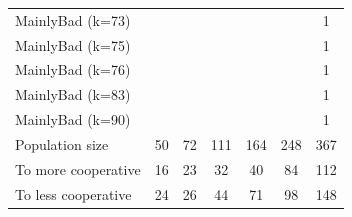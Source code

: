 \documentclass[journal,10pt,twoside]{IEEEtran}
\begin{document}
\begin{table}[ht]
\begin{tabular}{l|cccccc}
        MainlyBad (k=73)     &     &     &      &      &      &    1 \\
        MainlyBad (k=75)     &     &     &      &      &      &    1 \\
        MainlyBad (k=76)     &     &     &      &      &      &    1 \\
        MainlyBad (k=83)     &     &     &      &      &      &    1 \\
        MainlyBad (k=90)     &     &     &      &      &      &    1 \\ \midrule
        Population size      &  50 &  72 &  111 &  164 &  248 &  367 \\
        To more cooperative  &  16 &  23 &   32 &   40 &   84 &  112 \\
        To less cooperative  &  24 &  26 &   44 &   71 &   98 &  148 \\ \bottomrule

    \end{tabular}
\end{table}
\end{document}
